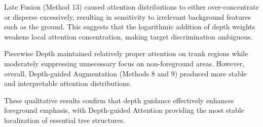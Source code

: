 Late Fusion (Method 13) caused attention distributions to either over-concentrate or disperse excessively, resulting in sensitivity to irrelevant background features such as the ground. This suggests that the logarithmic addition of depth weights weakens local attention concentration, making target discrimination ambiguous.

Piecewise Depth maintained relatively proper attention on trunk regions while moderately suppressing unnecessary focus on non-foreground areas. However, overall, Depth-guided Augmentation (Methods 8 and 9) produced more stable and interpretable attention distributions.

These qualitative results confirm that depth guidance effectively enhances foreground emphasis, with Depth-guided Attention providing the most stable localization of essential tree structures.

